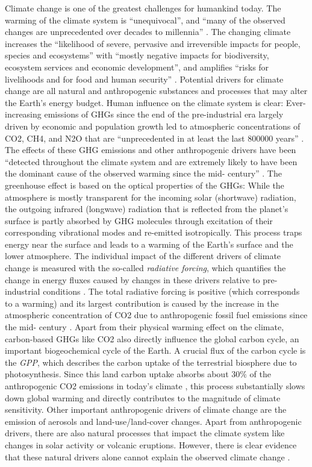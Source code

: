 Climate change is one of the greatest challenges for humankind today. The
warming of the climate system is \enquote{unequivocal}, and \enquote{many of
  the observed changes are unprecedented over decades to millennia}
\autocite{IPCC2014}. The changing climate increases the \enquote{likelihood of
  severe, pervasive and irreversible impacts for people, species and
  ecosystems} with \enquote{mostly negative impacts for biodiversity, ecosystem
services and economic development}, and amplifies \enquote{risks for
livelihoods and for food and human security} \autocite{IPCC2014}. Potential
drivers for climate change are all natural and anthropogenic substances and
processes that may alter the Earth's energy budget. Human influence on the
climate system is clear: Ever-increasing emissions of \acp{GHG} since the end
of the pre-industrial era largely driven by economic and population growth
led to atmospheric concentrations of \ac{CO2}, \ac{CH4}, and \ac{N2O} that
are \enquote{unprecedented in at least the last 800000 years}
\autocite{IPCC2014}. The effects of these \ac{GHG} emissions and other
anthropogenic drivers have been \enquote{detected throughout the climate
system and are extremely likely to have been the dominant cause of the
observed warming since the mid- century} \autocite{IPCC2014}. The
greenhouse effect is based on the optical properties of the \acp{GHG}: While
the atmosphere is mostly transparent for the incoming solar (shortwave)
radiation, the outgoing infrared (longwave) radiation that is reflected from
the planet's surface is partly absorbed by \ac{GHG} molecules through
excitation of their corresponding vibrational modes and re-emitted
isotropically. This process traps energy near the surface and leads to a
warming of the Earth's surface and the lower atmosphere. The individual
impact of the different drivers of climate change is measured with the
so-called \emph{radiative forcing}, which quantifies the change in energy
fluxes caused by changes in these drivers relative to pre-industrial
conditions \autocite{IPCC2013}. The total radiative forcing is positive
(which corresponds to a warming) and its largest contribution is caused by
the increase in the atmospheric concentration of \ac{CO2} due to
anthropogenic fossil fuel emissions since the mid- century
\autocite{IPCC2014}. Apart from their physical warming effect on the climate,
carbon-based \acp{GHG} like \ac{CO2} also directly influence the global
carbon cycle, an important biogeochemical cycle of the Earth. A crucial flux
of the carbon cycle is the \emph{\ac{GPP}}, which describes the carbon uptake
of the terrestrial biosphere due to photosynthesis. Since this land carbon
uptake absorbs about $30 \unit{\%}$ of the anthropogenic \ac{CO2} emissions
in today's climate \autocite{Friedlingstein2020}, this process substantially
slows down global warming and directly contributes to the magnitude of
climate sensitivity. Other important anthropogenic drivers of climate change
are the emission of aerosols and land-use/land-cover changes. Apart from
anthropogenic drivers, there are also natural processes that impact the
climate system like changes in solar activity or volcanic eruptions. However,
there is clear evidence that these natural drivers alone cannot explain the
observed climate change \autocite{Haustein2017}.


